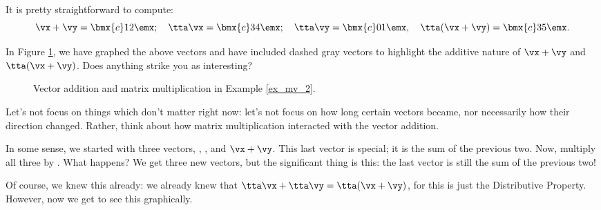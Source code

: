 {It is pretty straightforward to compute: 
$$\vx+\vy = \bmx{c} 1\\2\emx;\quad \tta\vx = \bmx{c}3\\4\emx; \quad \tta\vy = \bmx{c} 0\\1\emx,\quad \tta(\vx+\vy) = \bmx{c} 3\\5\emx.$$

In Figure \ref{fig:mv_2}, we have graphed the above vectors and have included dashed gray vectors to highlight the additive nature of $\vx+\vy$ and $\tta(\vx+\vy)$. Does anything strike you as interesting?

\begin{figure}[h!]
\begin{center}
\end{center}
\caption{Vector addition and matrix multiplication in Example \ref{ex_mv_2}.}
\label{fig:mv_2}
\end{figure}

Let's not focus on things which don't matter right now: let's not focus on how long certain vectors became, nor necessarily how their direction changed. Rather, think about how matrix multiplication interacted with the vector addition.

In some sense, we started with three vectors, \vx, \vy, and $\vx+\vy$. This last vector is special; it is the sum of the previous two. Now, multiply all three by \tta. What happens? We get three new vectors, but the significant thing is this: the last vector is still the sum of the previous two!

Of course, we knew this already: we already knew that $\tta\vx + \tta\vy = \tta(\vx+\vy)$, for this is just the Distributive Property. However, now we get to see this graphically.}\\ %

